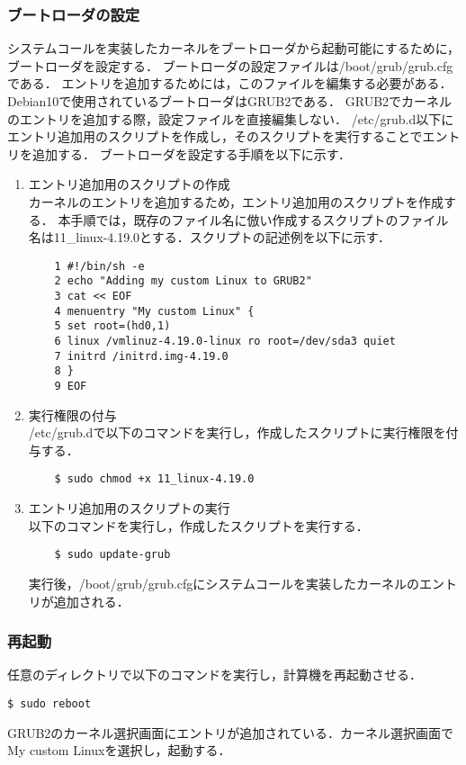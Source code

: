 \documentclass[12pt]{jsarticle}
\begin{document}
\subsubsection{ブートローダの設定}
システムコールを実装したカーネルをブートローダから起動可能にするために，ブートローダを設定する．
ブートローダの設定ファイルは/boot/grub/grub.cfgである．
エントリを追加するためには，このファイルを編集する必要がある．
Debian10で使用されているブートローダはGRUB2である．
GRUB2でカーネルのエントリを追加する際，設定ファイルを直接編集しない．
/etc/grub.d以下にエントリ追加用のスクリプトを作成し，そのスクリプトを実行することでエントリを追加する．
ブートローダを設定する手順を以下に示す．
\begin{enumerate}
\item エントリ追加用のスクリプトの作成\\
	カーネルのエントリを追加するため，エントリ追加用のスクリプトを作成する．
	本手順では，既存のファイル名に倣い作成するスクリプトのファイル名は11\_linux-4.19.0とする．スクリプトの記述例を以下に示す．
	\begin{verbatim}
	1 #!/bin/sh -e
	2 echo "Adding my custom Linux to GRUB2"
	3 cat << EOF
	4 menuentry "My custom Linux" {
	5 set root=(hd0,1)
	6 linux /vmlinuz-4.19.0-linux ro root=/dev/sda3 quiet
	7 initrd /initrd.img-4.19.0
	8 }
	9 EOF
	\end{verbatim}

\item 実行権限の付与\\
	/etc/grub.dで以下のコマンドを実行し，作成したスクリプトに実行権限を付与する．
	\begin{verbatim}
	$ sudo chmod +x 11_linux-4.19.0
	\end{verbatim}
	
\item エントリ追加用のスクリプトの実行\\
	以下のコマンドを実行し，作成したスクリプトを実行する．
	\begin{verbatim}
	$ sudo update-grub
	\end{verbatim}
	実行後，/boot/grub/grub.cfgにシステムコールを実装したカーネルのエントリが追加される．

\end{enumerate}
\subsubsection{再起動}
任意のディレクトリで以下のコマンドを実行し，計算機を再起動させる．
\begin{verbatim}
$ sudo reboot
\end{verbatim}
GRUB2のカーネル選択画面にエントリが追加されている．カーネル選択画面でMy custom Linuxを選択し，起動する．
\end{document}

